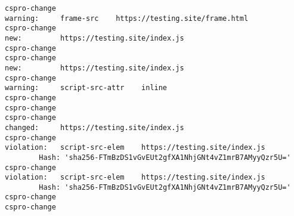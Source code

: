 \begin{verbatim}
cspro-change
warning:     frame-src    https://testing.site/frame.html
cspro-change
new:         https://testing.site/index.js
cspro-change
cspro-change
new:         https://testing.site/index.js
cspro-change
warning:     script-src-attr    inline
cspro-change
cspro-change
cspro-change
changed:     https://testing.site/index.js
cspro-change
violation:   script-src-elem    https://testing.site/index.js    
        Hash: 'sha256-FTmBzDS1vGvEUt2gfXA1NhjGNt4vZ1mrB7AMyyQzr5U='
cspro-change
violation:   script-src-elem    https://testing.site/index.js    
        Hash: 'sha256-FTmBzDS1vGvEUt2gfXA1NhjGNt4vZ1mrB7AMyyQzr5U='
cspro-change
cspro-change
\end{verbatim}

